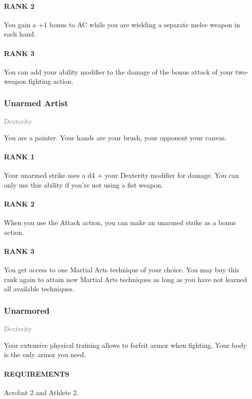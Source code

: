 \paragraph{RANK 2} You gain a +1 bonus to AC while you are wielding a separate melee weapon in each hand.
\paragraph{RANK 3} You can add your ability modifier to the damage of the bonus attack of your two-weapon fighting action.

\subsubsection{Unarmed Artist} \label{feat::unarmedartist}
\small{\textcolor{gray}{Dexterity}}

\normalsize
You are a painter.
Your hands are your brush, your opponent your canvas.
\paragraph{RANK 1} Your unarmed strike uses a d4 + your Dexterity modifier for damage.
You can only use this ability if you're not using a fist weapon.
\paragraph{RANK 2} When you use the Attack action, you can make an unarmed strike as a bonus action.
\paragraph{RANK 3} You get access to one Martial Arts technique of your choice.
You may buy this rank again to attain new Martial Arts techniques as long as you have not learned all available techniques.

\subsubsection{Unarmored} \label{feat::unarmored}
\small{\textcolor{gray}{Dexterity}}

\normalsize
Your extensive physical training allows to forfeit armor when fighting.
Your body is the only armor you need.
\paragraph{REQUIREMENTS} Acrobat 2 and Athlete 2.
